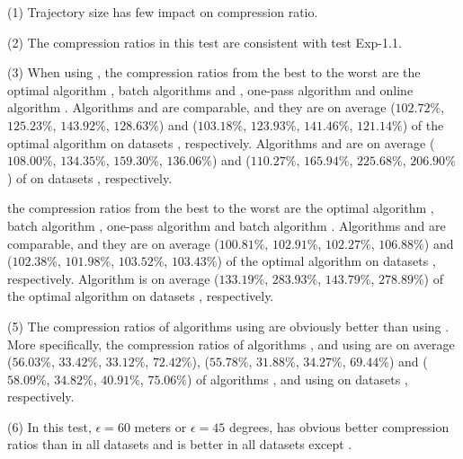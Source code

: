 \sstab (1) Trajectory size has few impact on compression ratio.

\sstab (2) The compression ratios in this test are consistent with test Exp-1.1.

\sstab (3) When using \sed, the compression ratios from the best
to the worst are the optimal algorithm \opt, batch algorithms \tpa and
\dpa, one-pass algorithm \cised and online algorithm \squishe.
%
{Algorithms \tpa and \dpa are comparable, and they are on average
($102.72\%$, $125.23\%$, $143.92\%$, $128.63\%$) and ($103.18\%$, $123.93\%$, $141.46\%$, $121.14\%$)
 of the optimal algorithm \opt on datasets \dSets, respectively.}
%
{Algorithms \cised and \squishe are on average ($108.00\%$,
  $134.35\%$, $159.30\%$, $136.06\%$) and ($110.27\%$, $165.94\%$, $225.68\%$, $206.90\%$)
 of \opt on datasets \dSets, respectively.}

 the compression ratios from the best
to the worst are the optimal algorithm \opt, batch algorithm \tpa,
one-pass algorithm \interval and batch algorithm \dpa.
%
{Algorithms \tpa and \interval are comparable, and they are on average
($100.81\%$, $102.91\%$, $102.27\%$, $106.88\%$) and ($102.38\%$, $101.98\%$, $103.52\%$, $103.43\%$)
 of the optimal algorithm \opt on datasets \dSets, respectively.}
%
{Algorithm \dpa is on average ($133.19\%$, $283.93\%$, $143.79\%$, $278.89\%$)
 of the optimal algorithm \opt on datasets \dSets, respectively.}
%
%


\sstab (5) The compression ratios of algorithms using \ped are obviously better than using \sed.
More specifically, the compression ratios of algorithms \opt, \tpa and \dpa
using \ped are on average {($56.03\%$, $33.42\%$, $33.12\%$, $72.42\%$),
($55.78\%$, $31.88\%$, $34.27\%$, $69.44\%$) and ($58.09\%$, $34.82\%$,
$40.91\%$, $75.06\%$)} of algorithms \opt, \tpa and \dpa using \sed on datasets \dSets, respectively.

\sstab (6) In this test, \ie $\epsilon =60$ meters or $\epsilon = 45$ degrees, \ped has obvious better compression ratios than \dad in all datasets and \sed is better in all datasets except \ucar.

